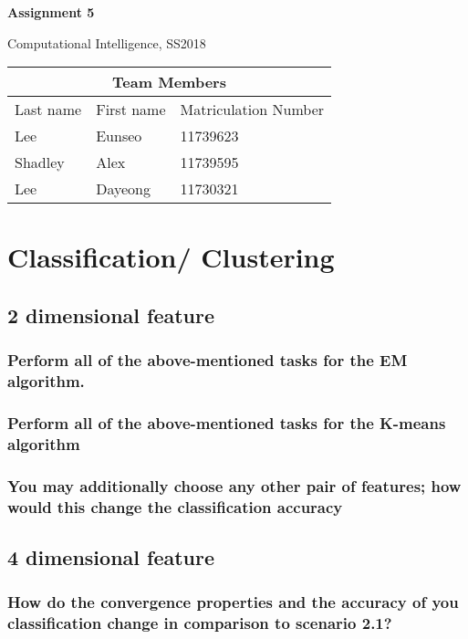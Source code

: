 \documentclass[a4paper]{article}
\begin{document}
	\begin{titlepage}
		\centering
		{\huge \bf Assignment 5\par}
		\vspace{1cm}
		{\Large Computational Intelligence, SS2018\par}
		\vspace{1cm}
		\begin{tabular}{|l|l|l|}
			\hline
			\multicolumn{3}{|c|}{\textbf{Team Members}}   \\ \hline
			Last name & First name & Matriculation Number \\ \hline
			Lee       & Eunseo     & 11739623             \\ \hline
			Shadley   & Alex       & 11739595             \\ \hline
			Lee       & Dayeong    & 11730321             \\ \hline
		\end{tabular}
	\end{titlepage}
	
	\section{Classiﬁcation/ Clustering}
	\subsection{2 dimensional feature}
	\subsubsection{Perform all of the above-mentioned tasks for the EM algorithm.}
	\subsubsection{Perform all of the above-mentioned tasks for the K-means algorithm}
	\subsubsection{You may additionally choose any other pair of features; how would this change the classiﬁcation accuracy}
	
	\subsection{4 dimensional feature}
	\subsubsection{How do the convergence properties and the accuracy of you classiﬁcation change in comparison to scenario 2.1? }
\end{document}
